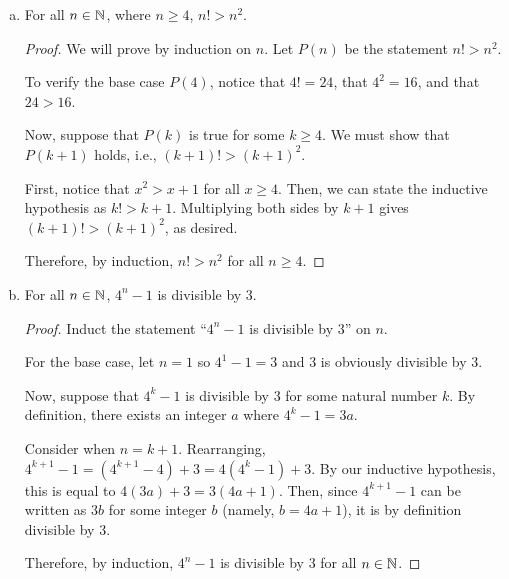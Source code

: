\documentclass{agony}
\begin{document}
\begin{enumerate}[(a)]
\begin{proof}
          Verify the base case $P(1)$:
          \[ \sum^1_{i=1} \frac{i}{2^i} = \frac{1}{2} = 2 - \frac{3}{2} = 2 -\frac{1+2}{2^1} \]
          Suppose that $P(k)$ holds for some $k$, and consider $P(k+1)$. Now,
          \begin{align*}
            \sum^{n+1}_{i=1} \frac{i}{2^i}
             & = \frac{k+1}{2^{k+1}} + \sum^n_{i=1} \frac{i}{2^i} \\
             & = \frac{k+1}{2^{k+1}} + 2-\frac{k+2}{2^k} \IH      \\
             & = 2 + \frac{k+1 - 2(k+2)}{2^{k+1}}                 \\
             & = 2 - \frac{k+3}{2^{k+1}}
          \end{align*}
          as required.
          Because $P(1)$ holds and $P(k)$ implies $P(k+1)$, by induction, $P(n)$ holds for all $n$.
        \end{proof}
  \item For all $n\in\mathbb{N}$, where $n \geq 4$, $n! > n^2$.
        \begin{proof}
          We will prove by induction on $n$.
          Let $P(n)$ be the statement $n! > n^2$.

          To verify the base case $P(4)$, notice that $4! = 24$, that $4^2 = 16$, and that $24 > 16$.

          Now, suppose that $P(k)$ is true for some $k \geq 4$.
          We must show that $P(k+1)$ holds, i.e., $(k+1)! > (k+1)^2$.

          First, notice that $x^2 > x+1$ for all $x \geq 4$.
          Then, we can state the inductive hypothesis as $k! > k+1$.
          Multiplying both sides by $k+1$ gives $(k+1)! > (k+1)^2$, as desired.

          Therefore, by induction, $n! > n^2$ for all $n \geq 4$.
        \end{proof}
  \item For all $n\in\mathbb{N}$, $4^n-1$ is divisible by 3.
        \begin{proof}
          Induct the statement ``$4^n-1$ is divisible by 3'' on $n$.

          For the base case, let $n=1$ so $4^1-1=3$ and 3 is obviously divisible by 3.

          Now, suppose that $4^k-1$ is divisible by 3 for some natural number $k$.
          By definition, there exists an integer $a$ where $4^k-1 = 3a$.

          Consider when $n = k+1$. Rearranging,
          $4^{k+1}-1 = (4^{k+1} - 4) + 3 = 4(4^k-1)+3$.
          By our inductive hypothesis, this is equal to $4(3a)+3 = 3(4a+1)$.
          Then, since $4^{k+1}-1$ can be written as $3b$ for some integer $b$ (namely, $b = 4a+1$),
          it is by definition divisible by 3.

          Therefore, by induction, $4^n-1$ is divisible by 3 for all $n\in\mathbb{N}$.
        \end{proof}
\end{enumerate}
\end{document}
